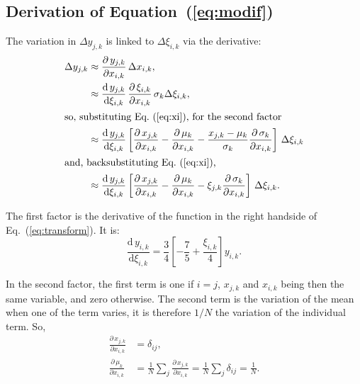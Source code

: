 \documentclass[twocolumn]{article}
\def\der#1#2{\frac{\mathrm{d}\,{#1}}{\mathrm{d}#2}}
\def\pder#1#2{\frac{\partial\,{#1}}{\partial#2}}
\def\eqref#1{Eq.~(\ref{eq:#1})}
\begin{document}
\subsection{Derivation of Equation~(\ref{eq:modif})}
\label{sec:calculus}
The variation in $\Delta y_{j,k}$ is linked to $\Delta \xi_{i,k}$ via the
derivative:
\begin{align}
    \Delta y_{j,k} 
        &\approx \pder{y_{j,k}}{x_{i,k}}
                 \, \Delta x_{i,k},\\
        &\approx \der{y_{j,k}}{\xi_{i,k}}
                 \, \pder{\xi_{i,k}}{x_{i,k}}
                 \, \sigma_k \Delta \xi_{i,k},\\
\intertext{so, substituting \eqref{xi}, for the second factor}
        &\approx \der{y_{j,k}}{\xi_{i,k}}
                 \left[
                    \pder{x_{j,k}}{x_{i,k}}
                  - \pder{\mu_k}{x_{i,k}} 
                  - \frac{x_{j,k}-\mu_k}{\sigma_k}\pder{\sigma_k}{x_{i,k}} 
                 \right] 
                 \, \Delta \xi_{i,k}\\
\intertext{and, backsubstituting \eqref{xi},}
        &\approx \der{y_{j,k}}{\xi_{i,k}}
                 \left[
                    \pder{x_{j,k}}{x_{i,k}}
                  - \pder{\mu_k}{x_{i,k}}
                  - \xi_{j,k} \pder{\sigma_k}{x_{i,k}}
                 \right]
                 \, \Delta \xi_{i,k}.
\end{align}

The first factor is the derivative of the function in the right handside of Eq.~(\ref{eq:transform}). It is:
\begin{equation}
    \der{y_{i,k}}{\xi_{i,k}} = \frac34 \left[ -\frac75 + \frac{\xi_{i,k}}4 \right] y_{i,k}.
\end{equation}

In the second factor, the first term is one if $i = j$, $x_{j,k}$ and $x_{i,k}$ being then the same variable, and zero otherwise.  The second term is the variation of the mean when one of the term varies, it is therefore $1/N$ the variation of the individual term. So,
\begin{align}
    \pder{x_{j,k}}{x_{i,k}} &= \delta_{ij}, \label{eq:derx}\\
    \pder{\mu_k}{x_{i,k}}   &= \frac 1N \sum_j \pder{x_{j,k}}{x_{i,k}}
                             = \frac 1N \sum_j \delta_{ij}
                             = \frac 1N. \label{eq:dermu}
\end{align}
\end{document}
